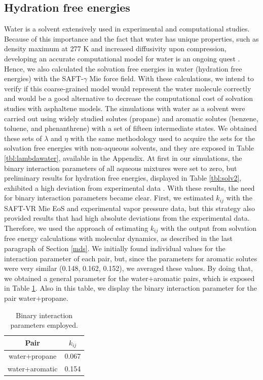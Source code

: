 \documentclass[final,12p,times,twocolumn]{elsarticle}
\begin{document}
	\subsection{Hydration free energies}
	
	Water is a solvent extensively used in experimental and computational studies. Because of this importance and the fact that water has unique properties, such as density maximum at 277 K and increased diffusivity upon compression, developing an accurate computational model for water is an ongoing quest \cite{hadley2012}. Hence, we also calculated the solvation free energies in water (hydration free energies) with the SAFT-$\gamma$ Mie force field. With these calculations, we intend to verify if this coarse-grained model would represent the water molecule correctly and would be a good alternative to decrease the computational cost of solvation studies with asphaltene models. The simulations with water as a solvent were carried out using widely studied solutes (propane) and aromatic solutes (benzene, toluene, and phenanthrene) with a set of fifteen intermediate states.  We obtained these sets of $\lambda$ and $\eta$ with the same methodology used to acquire the sets for the solvation free energies with non-aqueous solvents, and they are exposed in Table \ref{tbl:lambdawater}, available in the Appendix. At first in our simulations, the binary interaction parameters of all aqueous mixtures were set to zero, but preliminary results for hydration free energies, displayed in Table \ref{tbl:solv2},  exhibited a high deviation from experimental data \cite{P29900000291, doi:10.1021/ct050097l}. With these results, the need for binary interaction parameters became clear. First, we estimated $k_{ij}$ with the SAFT-VR Mie EoS and experimental vapor pressure data, but this strategy also provided results that had high absolute deviations from the experimental data. Therefore, we used the approach of estimating $k_{ij}$ with the output from solvation free energy calculations with molecular dynamics, as described in the last paragraph of Section \ref{mds}.  We initially found individual values for the interaction parameter of each pair, but, since the parameters for aromatic solutes were very similar (0.148, 0.162, 0.152), we averaged these values. By doing that,  we obtained a general parameter for the water+aromatic pairs, which is exposed in Table \ref{tbl:kij}. Also in this table, we display the binary interaction parameter for the pair water+propane. 
	
	\begin{table}
		\centering
		\caption{Binary interaction parameters employed.}
		\label{tbl:kij}
		\begin{tabular}{cc}
			\hline\hline
			Pair              & $k_{ij}$ \\ \hline
			water+propane  & 0.067    \\
			water+aromatic & 0.154    \\ \hline\hline
		\end{tabular}
	\end{table}
	
\end{document}
